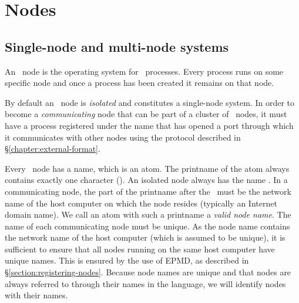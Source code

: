 %
%
%
%
%
%
%

\chapter{Nodes}

\label{chapter:nodes}

\section{Single-node and multi-node systems}

\label{section:single-multi-node}

An \Erlang\ node is the operating system for \Erlang\ processes.  
Every process runs on some specific node and once a process has been created
it remains on that node.

By default an \Erlang\ node is \emph{isolated} and constitutes a single-node system.
In order to become a \emph{communicating} node that can be part of a cluster
of \Erlang\ nodes, it
must have a process registered under the name
 that has
opened a port through which it communicates
with other nodes using the protocol described in \S\ref{chapter:external-format}.

Every \Erlang\ node has a name, which is an atom.  The printname of
the atom always contains exactly one  character ().  An isolated node always has the name
.
In a communicating node, the part of the printname after the \
must be the network name of the host computer on which the node
resides (typically an Internet domain name).  We call an atom with
such a printname a \emph{valid node name}.  The name of each
communicating node must be unique.  As the node name contains the
network name of the host computer (which is assumed to be unique), it
is sufficient to ensure that all nodes running on the same host
computer have unique names.  This is ensured by the use of EPMD, as
described in \S\ref{section:registering-nodes}.  Because node names
are unique and that nodes are always referred to through their names
in the language, we will identify nodes with their names.

